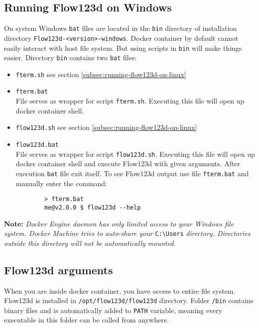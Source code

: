 \documentclass[12pt,a4paper]{report}
\begin{document}
\subsection{Running Flow123d on Windows}
On system Windows \verb'bat' files are located in the \verb'bin' directory of installation directory \verb'Flow123d-<version>-windows'.
Docker container by default cannot easily interact with host file system. But using scripts in \verb'bin' will make things easier.
Directory \verb'bin' contains two \verb'bat' files:
\begin{itemize}
	\item \verb'fterm.sh' see section \ref{subsec:running-flow123d-on-linux}
	
	\item \verb'fterm.bat' \\
	File serves as wrapper for script \verb'fterm.sh'. Executing this file will open up docker container shell.

	\item \verb'flow123d.sh' see section \ref{subsec:running-flow123d-on-linux}	
	
	\item \verb'flow123d.bat' \\
	File serves as wrapper for script \verb'flow123d.sh'. Executing this file will open up docker container shell and execute 
	Flow123d with given arguments. After execution \verb'bat' file exit itself. To see Flow123d output use file \verb'fterm.bat'
	and manually enter the command:
	\begin{verbatim}
		> fterm.bat
		me@v2.0.0 $ flow123d --help
	\end{verbatim}
\end{itemize}

\textbf{Note:}
\textit{Docker Engine daemon has only limited access to your Windows file system. Docker Machine tries to auto-share your}
\verb'C:\Users' \textit{directory. Directories outside this directory will not be automatically mounted.} 

\subsection{Flow123d arguments}
When you are inside docker container, you have access to entire file system. Flow123d is installed in 
\verb'/opt/flow123d/flow123d' directory. Folder \verb'/bin' contains binary files and is automatically 
added to \verb'PATH' variable, meaning every executable in this folder can be called from anywhere.
\end{document}

